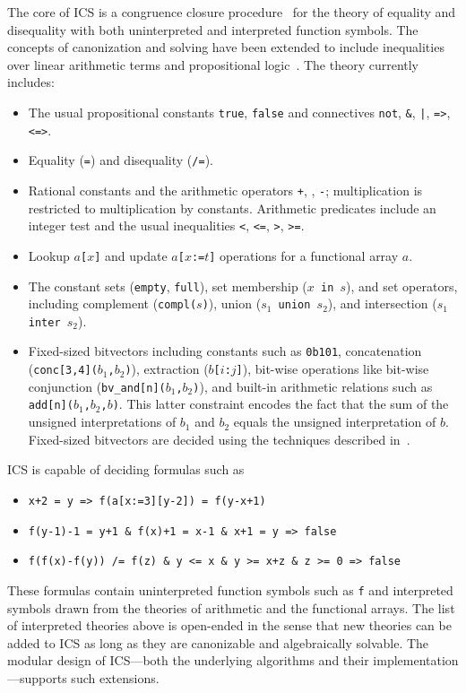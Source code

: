 \documentclass[12pt]{article}
\begin{document}
The core of ICS is a congruence closure procedure~\cite{RuessShankar2001}
for the theory of equality and disequality with both uninterpreted and
interpreted function symbols.  The concepts of canonization and solving
have been extended to include inequalities over linear arithmetic
terms and propositional logic~\cite{FORS2001}\@.
The theory currently includes:
  \begin{itemize}
  \item The usual propositional constants {\tt true}, {\tt false}
        and connectives
        {\tt not}, {\tt \&}, {\tt |}, {\tt =>}, {\tt <=>}\@.
  \item Equality ({\tt =}) and disequality ({\tt /=})\@.
  \item Rational constants and the arithmetic
        operators {\tt +}, {\tt *}, {\tt -}\@;
        multiplication is restricted to
        multiplication by constants.
        Arithmetic predicates include an integer test and
        the usual inequalities {\tt <}, {\tt <=}, {\tt >}, {\tt >=}\@.
  \item Lookup {\tt $a$[$x$]} and update {\tt $a$[$x$:=$t$]}
        operations for a functional array $a$\@.
  \item The constant sets ({\tt empty}, {\tt full}), 
        set membership ({\tt $x$ in $s$}),
        and set operators, including
        complement ({\tt compl($s$)}),
        union ({\tt $s_1$ union $s_2$}),
        and intersection ({\tt $s_1$ inter $s_2$})\@.
  \item Fixed-sized bitvectors including constants such as {\tt 0b101},
        concatenation ({\tt conc[3,4]($b_1$,$b_2$)}),
        extraction ({\tt $b$[$i$:$j$]}), bit-wise operations
        like bit-wise conjunction  ({\tt bv\_and[n]($b_1$,$b_2$)}),
        and built-in arithmetic relations such as {\tt add[n]($b_1$,$b_2$,$b$)}\@.
        This latter constraint encodes the fact that the sum of the unsigned
        interpretations of $b_1$ and $b_2$ equals the unsigned
        interpretation of $b$.  Fixed-sized bitvectors are
        decided using the techniques described in~\cite{Moeller98:FMCAD}\@.
  \end{itemize}
ICS is capable of deciding formulas such as
  \begin{itemize}
  \item {\tt x+2 = y => f(a[x:=3][y-2]) = f(y-x+1)}
  \item {\tt f(y-1)-1 = y+1 \&  f(x)+1 = x-1 \& x+1 = y => false}
  \item {\tt f(f(x)-f(y)) /= f(z) \&  y <= x \& y >= x+z \& z >= 0 => false}
  \end{itemize}
These formulas contain uninterpreted function symbols
such as {\tt f} and interpreted symbols drawn from the theories of
arithmetic and the functional arrays.  The list of
interpreted theories above is open-ended in the sense that new
theories can be added to ICS as long as they are canonizable and
algebraically solvable. The modular design of ICS---both the
underlying algorithms and their implementation---supports such
extensions.
\end{document}
